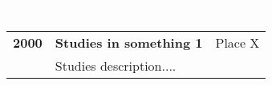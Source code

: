 
\newcommand{\AwardEntry}[4]{
\begin{tabular}{ l l r }
  \textbf{\textcolor{materialPurple}{#1}}\hspace{20pt} & \textbf{#2} & {\small \textcolor{textLightGray}{#4}}\\
  	& \normalsize #3\\
\end{tabular}
\vspace*{10pt}
}

\LARGE
\noindent\colorbox{materialPurple}
{\parbox[c][25pt][c]{\textwidth}{\hspace{15pt}\textcolor{white}{Awards}}} %

\large
\vspace*{5pt}

\AwardEntry{2000}{Studies in something 1}{Studies description....}{Place X}

\vspace*{5pt}
